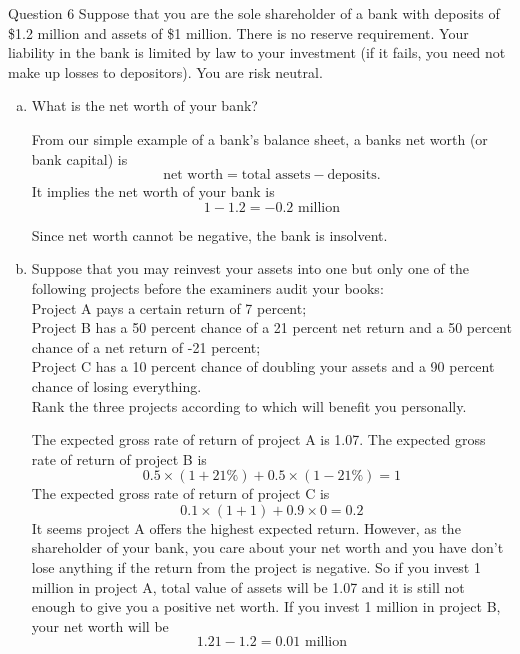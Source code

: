 \documentclass[a4paper]{article}
\newif\IfInSansMode
\numberwithin{equation}{section}
\numberwithin{figure}{section}
\begin{document}
	\begin{questionbox}{Question 6}
		Suppose that you are the sole shareholder of a bank with deposits of \$1.2 million and assets of \$1 million. There is no reserve requirement. Your liability in the bank is limited by law to your investment (if it fails, you need not make up losses to depositors). You are risk neutral.
		\begin{enumerate}[(a)]
			\item What is the net worth of your bank?
			\begin{explanationbox}
				From our simple example of a bank's balance sheet, a banks net worth (or bank capital) is
				\[
					\text{net worth} = \text{total assets} - \text{deposits}.
				\]
				It implies the net worth of your bank is
				\[
					1-1.2 = -0.2 \text{ million}
				\]
			\end{explanationbox}
			\begin{explanationbox}
				Since net worth cannot be negative, the bank is insolvent.
			\end{explanationbox}
			\item Suppose that you may reinvest your assets into one but only one of the following projects before the examiners audit your books:\\
			Project A pays a certain return of 7 percent;\\
			Project B has a 50 percent chance of a 21 percent net return and a 50 percent chance of a net return of -21 percent;\\
			Project C has a 10 percent chance of doubling your assets and a 90 percent chance of losing everything.\\
			Rank the three projects according to which will benefit you personally.
			\begin{explanationbox}
				The expected gross rate of return of project A is 1.07. The expected gross rate of return of project B is
				\[
					0.5 \times (1+21\%) + 0.5 \times (1-21\%) = 1
				\]
				The expected gross rate of return of project C is
				\[
					0.1 \times (1+1) +0.9 \times 0 = 0.2
				\]
				It seems project A offers the highest expected return. However, as the shareholder of your bank, you care about your net worth and you have don't lose anything if the return from the project is negative. So if you invest 1 million in project A, total value of assets will be 1.07 and it is still not enough to give you a positive net worth. If you invest 1 million in project B, your net worth will be
				\[
					1.21 - 1.2 = 0.01 \text{ million}
\]
\end{explanationbox}
\end{enumerate}
\end{questionbox}
\end{document}
